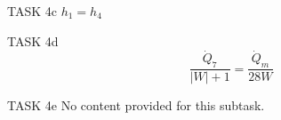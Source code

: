 TASK 4c  
\( h_1 = h_4 \)  

TASK 4d  
\[
\frac{\dot{Q}_7}{|W| + 1} = \frac{\dot{Q}_m}{28W}
\]  

TASK 4e  
No content provided for this subtask.